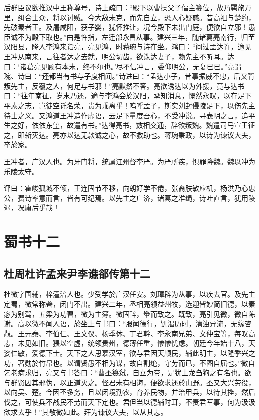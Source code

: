 \documentclass[12pt,UTF8]{ctexbook}
\begin{document}
后群臣议欲推汉中王称尊号，诗上疏曰：“殿下以曹操父子偪主篡位，故乃羁旅万里，纠合士众，将以讨贼。今大敌未克，而先自立，恐人心疑惑。昔高祖与楚约，先破秦者王。及屠咸阳，获子婴，犹怀推让，况今殿下未出门庭，便欲自立邪！愚臣诚不为殿下取也。”由是忤指，左迁部永昌从事。建兴三年，随诸葛亮南行，归至汉阳县，降人李鸿来诣亮，亮见鸿，时蒋琬与诗在坐。鸿曰：“间过孟达许，適见王冲从南来，言往者达之去就，明公切齿，欲诛达妻子，赖先主不听耳。达曰：‘诸葛亮见顾有本末，终不尔也。’尽不信冲言，委仰明公，无复已已。”亮谓琬、诗曰：“还都当有书与子度相闻。”诗进曰：“孟达小子，昔事振威不忠，后又背叛先主，反覆之人，何足与书邪！”亮默然不答。亮欲诱达以为外援，竟与达书曰：“往年南征，岁末乃还，適与李鸿会於汉阳，承知消息，慨然永叹，以存足下平素之志，岂徒空讬名荣，贵为乖离乎！呜呼孟子，斯实刘封侵陵足下，以伤先主待士之义。又鸿道王冲造作虚语，云足下量度吾心，不受冲说。寻表明之言，追平生之好，依依东望，故遣有书。”达得亮书，数相交通，辞欲叛魏。魏遣司马宣王征之，即斩灭达。亮亦以达无款诚之心，故不救助也。蒋琬秉政，以诗为谏议大夫，卒於家。

王冲者，广汉人也。为牙门将，统属江州督李严。为严所疾，惧罪降魏。魏以冲为乐陵太守。

评曰：霍峻孤城不倾，王连固节不移，向朗好学不倦，张裔肤敏应机，杨洪乃心忠公，费诗率意而言，皆有可纪焉。以先主之广济，诸葛之准绳，诗吐直言，犹用陵迟，况庸后乎哉！

\part{蜀书十二}
\chapter{杜周杜许孟来尹李谯郤传第十二}

杜微字国辅，梓潼涪人也。少受学於广汉任安。刘璋辟为从事，以疾去官。及先主定蜀，微常称聋，闭门不出。建兴二年，丞相亮领益州牧，选迎皆妙简旧德，以秦宓为别驾，五梁为功曹，微为主簿。微固辞，轝而致之。既致，亮引见微，微自陈谢。高以微不闻人语，於坐上与书曰：“服闻德行，饥渴历时，清浊异流，无缘咨覯。王元泰、李伯仁、王文仪、杨季休、丁君幹、李永南兄弟、文仲宝等，每叹高志，未见如旧。猥以空虚，统领贵州，德薄任重，惨惨忧虑。朝廷今年始十八，天姿仁敏，爱德下士。天下之人思慕汉室，欲与君因天顺民，辅此明主，以隆季兴之功，著勋於竹帛也。以谓贤愚不相为谋，故自割绝，守劳而已，不图自屈也。”微自乞老病求归，亮又与书答曰：“曹丕篡弑，自立为帝，是犹土龙刍狗之有名也。欲与群贤因其邪伪，以正道灭之。怪君未有相诲，便欲求还於山野。丕又大兴劳役，以向吴、楚。今因丕多务，且以闭境勤农，育养民物，并治甲兵，以待其挫，然后伐之，可使兵不战民不劳而天下定也。君但当以德辅时耳，不责君军事，何为汲汲欲求去乎！”其敬微如此。拜为谏议大夫，以从其志。
\end{document}

